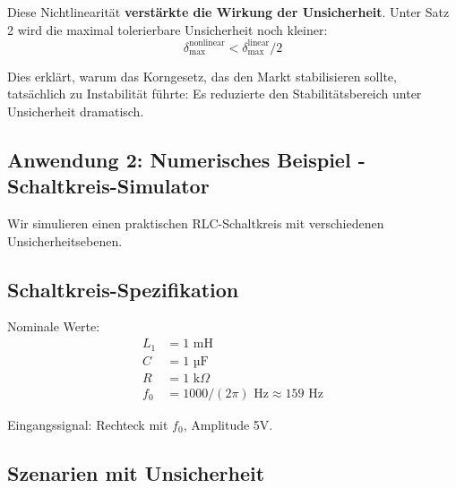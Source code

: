 \documentclass[a4paper,12pt,twoside]{report}
\theoremstyle{definition}
\begin{document}
Diese Nichtlinearität \textbf{verstärkte die Wirkung der Unsicherheit}. Unter Satz 2 wird die maximal tolerierbare Unsicherheit noch kleiner:
\begin{equation}
\delta_{\max}^{\text{nonlinear}} < \delta_{\max}^{\text{linear}} / 2
\end{equation}

Dies erklärt, warum das Korngesetz, das den Markt stabilisieren sollte, tatsächlich zu Instabilität führte: Es reduzierte den Stabilitätsbereich unter Unsicherheit dramatisch.

\subsection{Anwendung 2: Numerisches Beispiel - Schaltkreis-Simulator}

Wir simulieren einen praktischen RLC-Schaltkreis mit verschiedenen Unsicherheitsebenen.

\subsection{Schaltkreis-Spezifikation}

Nominale Werte:
\begin{align}
L_1 &= 1 \text{ mH} \\
C &= 1 \text{ µF} \\
R &= 1 \text{ k}\Omega \\
f_0 &= 1000/(2\pi) \text{ Hz} \approx 159 \text{ Hz}
\end{align}

Eingangssignal: Rechteck mit $f_0$, Amplitude 5V.

\subsection{Szenarien mit Unsicherheit}
\end{document}
